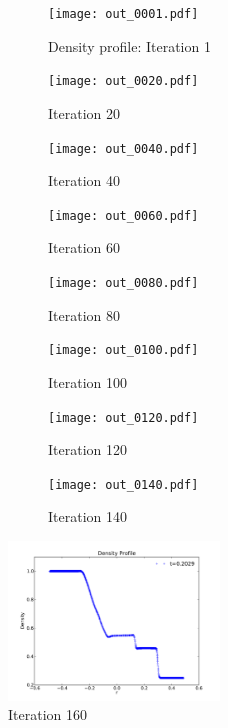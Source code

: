 \documentclass[11pt,letterpaper]{article}
\begin{document}
\begin{figure}[bth]
\centering
\begin{subfigure}{.5\textwidth}
  \centering
  \texttt{[image: out\_0001.pdf]}
  \caption*{Density profile: Iteration 1}
  \label{fig:sub1}
\end{subfigure}%
\begin{subfigure}{.5\textwidth}
  \centering
  \texttt{[image: out\_0020.pdf]}
  \caption*{Iteration 20}
  \label{fig:sub2}
\end{subfigure}
\caption{}
\label{fig:it1and20}
\end{figure}

\begin{figure}[bth]
\centering
\begin{subfigure}{.5\textwidth}
  \centering
  \texttt{[image: out\_0040.pdf]}
  \caption*{Iteration 40}
  \label{fig:sub3}
\end{subfigure}%
\begin{subfigure}{.5\textwidth}
  \centering
  \texttt{[image: out\_0060.pdf]}
  \caption*{Iteration 60}
  \label{fig:sub4}
\end{subfigure}
\caption{}
\label{fig:it40and60}
\end{figure}

\begin{figure}[bth]
\centering
\begin{subfigure}{.5\textwidth}
  \centering
  \texttt{[image: out\_0080.pdf]}
  \caption*{Iteration 80}
  \label{fig:sub5}
\end{subfigure}%
\begin{subfigure}{.5\textwidth}
  \centering
  \texttt{[image: out\_0100.pdf]}
  \caption*{Iteration 100}
  \label{fig:sub6}
\end{subfigure}
\caption{}
\label{fig:it80and100}
\end{figure}

\begin{figure}[bth]
\centering
\begin{subfigure}{.5\textwidth}
  \centering
  \texttt{[image: out\_0120.pdf]}
  \caption*{Iteration 120}
  \label{fig:sub5}
\end{subfigure}%
\begin{subfigure}{.5\textwidth}
  \centering
  \texttt{[image: out\_0140.pdf]}
  \caption*{Iteration 140}
  \label{fig:sub6}
\end{subfigure}
\caption{}
\label{fig:it120and140}
\end{figure}

\begin{figure}[bth]
\centering
\includegraphics[width=0.5\textwidth]{out_0160.pdf}
\caption{Iteration 160}
\label{fig:it160}
\end{figure}
\end{document}
